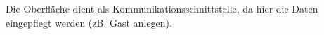 \documentclass[../../Pflichtenheft.tex]{subfiles}
\begin{document}
    Die Oberfläche dient als Kommunikationsschnittstelle, da hier die Daten eingepflegt werden (zB. Gast anlegen).
\end{document}
